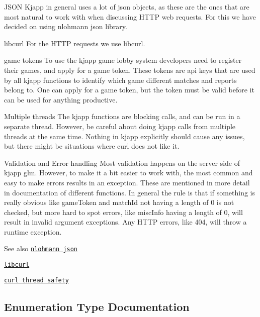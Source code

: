 \begin{DoxyParagraph}{J\+S\+ON}
Kjapp in general uses a lot of json objects, as these are the ones that are most natural to work with when discussing H\+T\+TP web requests. For this we have decided on using nlohmann json library.
\end{DoxyParagraph}
\begin{DoxyParagraph}{libcurl}
For the H\+T\+TP requests we use libcurl.
\end{DoxyParagraph}
\begin{DoxyParagraph}{game tokens}
To use the kjapp game lobby system developers need to register their games, and apply for a game token. These tokens are api keys that are used by all kjapp functions to identify which game different matches and reports belong to. One can apply for a game token, but the token must be valid before it can be used for anything productive.
\end{DoxyParagraph}
\begin{DoxyParagraph}{Multiple threads}
The kjapp functions are blocking calls, and can be run in a separate thread. However, be careful about doing kjapp calls from multiple threads at the same time. Nothing in kjapp explicitly should cause any issues, but there might be situations where curl does not like it.
\end{DoxyParagraph}
\begin{DoxyParagraph}{Validation and Error handling}
Most validation happens on the server side of kjapp glm. However, to make it a bit easier to work with, the most common and easy to make errors results in an exception. These are mentioned in more detail in documentation of different functions. In general the rule is that if something is really obvious like game\+Token and match\+Id not having a length of 0 is not checked, but more hard to spot errors, like misc\+Info having a length of 0, will result in invalid argument exceptions. Any H\+T\+TP errors, like 404, will throw a runtime exception.
\end{DoxyParagraph}
\begin{DoxySeeAlso}{See also}
\href{https://github.com/nlohmann/json}{\tt nlohmann json} 

\href{https://curl.haxx.se/libcurl/c/libcurl.html}{\tt libcurl} 

\href{https://curl.haxx.se/libcurl/c/threadsafe.html}{\tt curl thread safety} 
\end{DoxySeeAlso}


\subsection{Enumeration Type Documentation}
